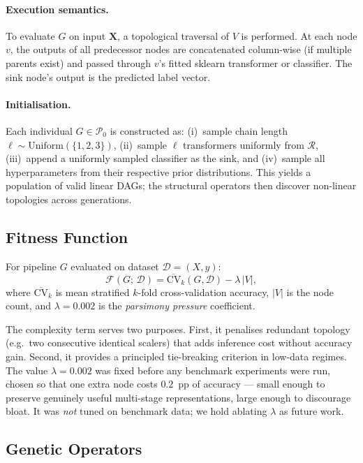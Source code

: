 \documentclass{article}
\theoremstyle{definition}
\theoremstyle{plain}
\theoremstyle{remark}
\begin{document}
\paragraph{Execution semantics.}
To evaluate $G$ on input $\mathbf{X}$, a topological traversal of $V$ is
performed.
At each node $v$, the outputs of all predecessor nodes are concatenated
column-wise (if multiple parents exist) and passed through $v$'s fitted
sklearn transformer or classifier.
The sink node's output is the predicted label vector.

\paragraph{Initialisation.}
Each individual $G \in \mathcal{P}_0$ is constructed as:
(i)~sample chain length $\ell \sim \mathrm{Uniform}(\{1,2,3\})$,
(ii)~sample $\ell$ transformers uniformly from $\mathcal{R}$,
(iii)~append a uniformly sampled classifier as the sink, and
(iv)~sample all hyperparameters from their respective prior distributions.
This yields a population of valid linear DAGs; the structural operators
then discover non-linear topologies across generations.

\subsection{Fitness Function}

For pipeline $G$ evaluated on dataset $\mathcal{D} = (X, y)$:
\begin{equation}
  \mathcal{F}(G;\,\mathcal{D})
    = \overline{\mathrm{CV}}_k(G,\mathcal{D}) - \lambda\,|V|,
  \label{eq:fitness}
\end{equation}
where $\overline{\mathrm{CV}}_k$ is mean stratified $k$-fold cross-validation
accuracy, $|V|$ is the node count, and $\lambda = 0.002$ is the
\emph{parsimony pressure} coefficient.

The complexity term serves two purposes.
First, it penalises redundant topology (e.g.\ two consecutive identical
scalers) that adds inference cost without accuracy gain.
Second, it provides a principled tie-breaking criterion in low-data regimes.
The value $\lambda = 0.002$ was fixed before any benchmark experiments
were run, chosen so that one extra node costs $0.2$~pp of accuracy —
small enough to preserve genuinely useful multi-stage representations,
large enough to discourage bloat.
It was \emph{not} tuned on benchmark data; we hold ablating $\lambda$
as future work.

\subsection{Genetic Operators}
\label{sec:operators}
\end{document}
